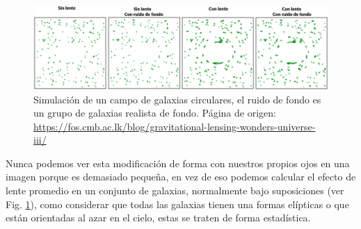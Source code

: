 \begin{figure}[h]
\centering
\includegraphics[width=1\textwidth]{Fisica_de_Particulas/imagenes/lentes.png}
\caption{Simulación de un campo de galaxias circulares, el ruido de fondo es un grupo de galaxias realista de fondo. Página de origen: \url{https://fos.cmb.ac.lk/blog/gravitational-lensing-wonders-universe-iii/}}
\label{lentes2}
\end{figure}
Nunca podemos ver esta modificación de forma con nuestros propios ojos en una imagen porque es demasiado pequeña, en vez de eso podemos calcular el efecto de lente promedio en un conjunto de galaxias, normalmente bajo suposiciones (ver Fig. \ref{lentes2}), como considerar que todas las galaxias tienen una formas elípticas o que están orientadas al azar en el cielo, estas se traten de forma estadística.

